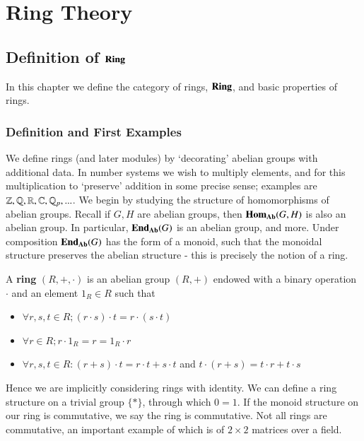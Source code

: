 \documentclass[12pt, a4paper, oneside, openright, titlepage]{book}
\begin{document}
\tableofcontents


\part{Ring Theory}

\chapter{Definition of $\normalfont\textbf{Ring}$}

In this chapter we define the category of rings, $\normalfont\textbf{Ring}$, and basic properties of rings.

\section{Definition and First Examples}

We define rings (and later modules) by `decorating' abelian groups with additional data. In number systems we wish to multiply elements, and for this multiplication to `preserve' addition in some precise sense; examples are $\mathbb Z, \mathbb Q,\mathbb R,\mathbb C,\mathbb Q_p,...$. We begin by studying the structure of homomorphisms of abelian groups. Recall if $G,H$ are abelian groups, then $\mathbf{Hom}_{\normalfont\textbf{Ab}}(G,H)$ is also an abelian group. In particular, $\mathbf{End}_{\normalfont\textbf{Ab}}(G)$ is an abelian group, and more. Under composition $\mathbf{End}_{\normalfont\textbf{Ab}}(G)$ has the form of a monoid, such that the monoidal structure preserves the abelian structure - this is precisely the notion of a ring.

\begin{defn}[Ring]
    A \textbf{ring} $(R,+,\cdot)$ is an abelian group $(R,+)$ endowed with a binary operation $\cdot$ and an element $1_R \in R$ such that \begin{itemize}
        \item $\forall r,s,t \in R; (r\cdot s)\cdot t = r\cdot (s\cdot t)$ 
        \item $\forall r \in R;r\cdot 1_R = r = 1_R\cdot r$
        \item $\forall r,s,t \in R: (r+s)\cdot t = r\cdot t + s\cdot t$ and $t\cdot (r+s) = t\cdot r + t\cdot s$
    \end{itemize}
\end{defn}

Hence we are implicitly considering rings with identity. We can define a ring structure on a trivial group $\{*\}$, through which $0 = 1$. If the monoid structure on our ring is commutative, we say the ring is commutative. Not all rings are commutative, an important example of which is of $2\times 2$ matrices over a field.
\end{document}

